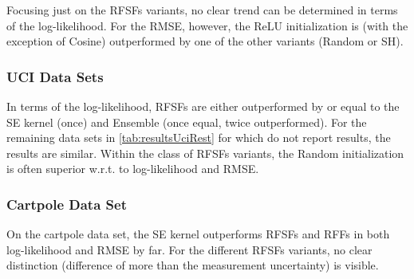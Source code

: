 		Focusing just on the \acp{RFSF} variants, no clear trend can be determined in terms of the log-likelihood.
		For the \ac{RMSE}, however, the \ac{ReLU} initialization is (with the exception of Cosine) outperformed by one of the other variants (Random or \ac{SH}).

	\subsubsection{\acs{UCI} Data Sets}
		In terms of the log-likelihood, \acp{RFSF} are either outperformed by or equal to the \ac{SE} kernel (once) and Ensemble (once equal, twice outperformed).
		For the remaining data sets in \cref{tab:resultsUciRest} for which\cite{watsonLatentDerivativeBayesian2021} do not report results, the results are similar.
		Within the class of \acp{RFSF} variants, the Random initialization is often superior w.r.t. to log-likelihood and \ac{RMSE}.

	\subsubsection{Cartpole Data Set}
		On the cartpole data set, the \ac{SE} kernel outperforms \acp{RFSF} and \acp{RFF} in both log-likelihood and \ac{RMSE} by far.
		For the different \acp{RFSF} variants, no clear distinction (difference of more than the measurement uncertainty) is visible.

